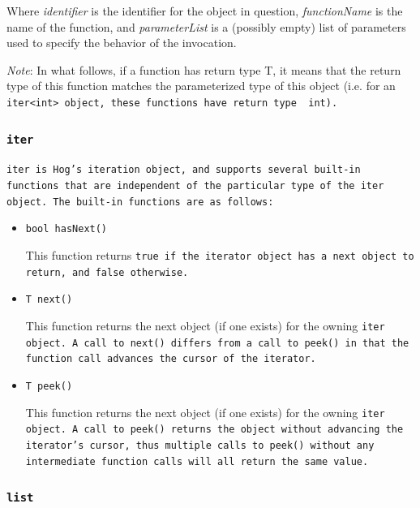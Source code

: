 \documentclass{book}
\begin{document}
\noindent Where \emph{identifier} is the identifier for the object in question,
\emph{functionName} is the name of the function, and \emph{parameterList} is a
(possibly empty) list of parameters used to specify the behavior of the
invocation.

\emph{Note}: In what follows, if a function has return type T, it means that
the return type of this function matches the parameterized type of this object
(i.e. for an \tt iter<int> \rm object, these functions have return type \tt
int\rm).

\subsubsection{\tt iter \rm} %
\label{ssub:iter}

\tt iter \rm is Hog's iteration object, and supports several built-in functions
that are independent of the particular type of the \tt iter \rm object. The
built-in functions are as follows:

\begin{itemize}

\item[] \tt bool hasNext() \rm

This function returns \tt true \rm if the iterator object has a next object
to return, and \tt false \rm otherwise.

\item[] \tt T next() \rm

This function returns the next object (if one exists) for the owning \tt iter \rm
object. A call to \tt next() \rm differs from a call to \tt peek() \rm in that the
function call advances the cursor of the iterator.

\item[] \tt T peek() \rm

This function returns the next object (if one exists) for the owning \tt iter
\rm object. A call to \tt peek() \rm returns the object without advancing the
iterator's cursor, thus multiple calls to \tt peek() \rm without any
intermediate function calls will all return the same value.

\end{itemize} 



\subsubsection{\tt list \rm} %
\label{ssub:list}
\end{document}
